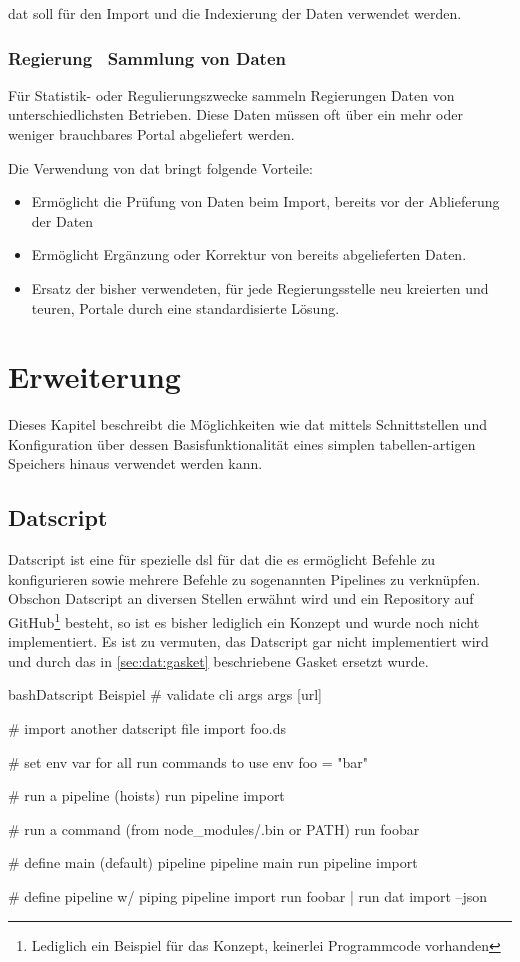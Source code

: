 dat soll für den Import und die Indexierung der Daten verwendet werden.

\subsection{Regierung \textendash\ Sammlung von Daten} %
Für Statistik- oder Regulierungszwecke sammeln Regierungen Daten von unterschiedlichsten Betrieben. Diese Daten müssen oft über ein mehr oder weniger brauchbares Portal abgeliefert werden.

Die Verwendung von dat bringt folgende Vorteile:
\begin{itemize}
\item Ermöglicht die Prüfung von Daten beim Import, bereits vor der Ablieferung der Daten
\item Ermöglicht Ergänzung oder Korrektur von bereits abgelieferten Daten.
\item Ersatz der bisher verwendeten, für jede Regierungsstelle neu kreierten und teuren, Portale durch eine standardisierte Lösung.
\end{itemize}

\chapter{Erweiterung}

Dieses Kapitel beschreibt die Möglichkeiten wie \gls{dat} mittels Schnittstellen und Konfiguration über dessen Basisfunktionalität eines simplen tabellen-artigen Speichers hinaus verwendet werden kann.

\section{Datscript} %

Datscript ist eine für spezielle \gls{dsl} für \gls{dat} die es ermöglicht Befehle zu konfigurieren sowie mehrere Befehle zu sogenannten Pipelines zu verknüpfen. Obschon Datscript an diversen Stellen erwähnt wird und ein Repository auf GitHub\footnote{Lediglich ein Beispiel für das Konzept, keinerlei Programmcode vorhanden} besteht, so ist es bisher lediglich ein Konzept und wurde noch nicht implementiert. Es ist zu vermuten, das Datscript gar nicht implementiert wird und durch das in \cref{sec:dat:gasket} beschriebene Gasket ersetzt wurde.


\begin{srclst}{bash}{Datscript Beispiel}
# validate cli args
args [url]

# import another datscript file
import foo.ds

# set env var for all run commands to use
env foo = "bar"

# run a pipeline (hoists)
run pipeline import

# run a command (from node_modules/.bin or PATH)
run foobar

# define main (default) pipeline
pipeline main
  run pipeline import

# define pipeline w/ piping
pipeline import
  run foobar | run dat import --json
\end{srclst}

